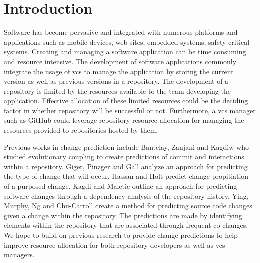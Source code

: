\chapter{Introduction}
\label{chap:introduction}

Software has become pervasive and integrated with numerous platforms and applications such as mobile devices, web sites, embedded systems, safety critical systems. Creating and managing a software application can be time consuming and resource intensive. The development of software applications commonly integrate the usage of \gls{vcs} to manage the application by storing the current version as well as previous versions in a repository. The development of a repository is limited by the resources available to the team developing the application. Effective allocation of these limited resources could be the deciding factor in whether repository will be successful or not. Furthermore, a \gls{vcs} manager such as GitHub could leverage repository resource allocation for managing the resources provided to repositories hosted by them.


Previous works in change prediction include Bantelay, Zanjani and Kagdiw who studied evolutionary coupling to create predictions of commit and interactions within a repository\cite{Bantelay2013}. Giger, Pinzger and Gall analyze an approach for predicting the type of change that will occur\cite{Giger2012}. Hassan and Holt predict change propitiation of a purposed change\cite{Hassan2004}. Kagdi and Maletic outline an approach for predicting software changes through a dependency analysis of the repository history\cite{Kagdi2007}. Ying, Murphy, Ng and Chu-Carroll create a method for predicting source code changes given a change within the repository\cite{ying2004}. The predictions are made by identifying elements within the repository that are associated through frequent co-changes. We hope to build on previous research to provide change predictions to help improve resource allocation for both repository developers as well as \gls{vcs} managers.



